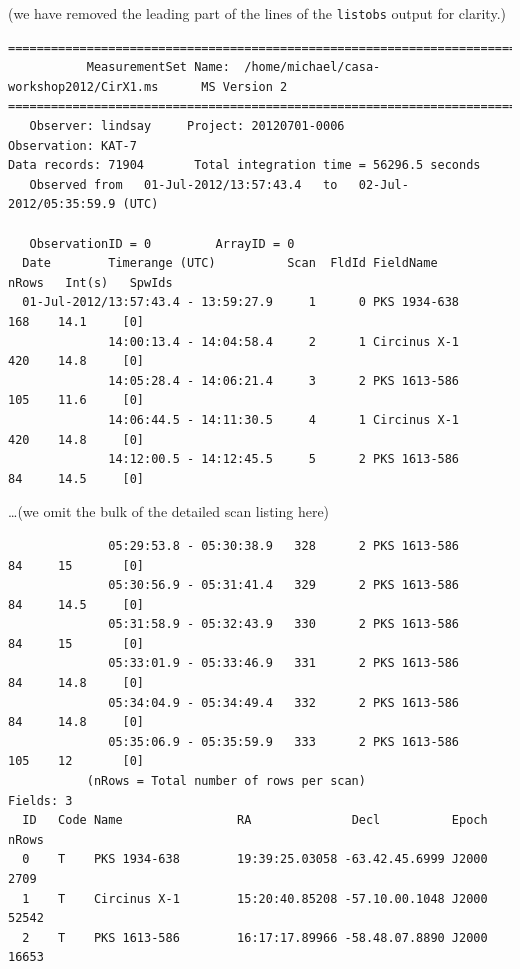\documentclass[force,almostfull,justified]{tufte-book}
\begin{document}
\begin{casaoutput}
(we have removed the leading part of the lines of the {\tt listobs} output
for clarity.)
\begin{verbatim}
================================================================================
           MeasurementSet Name:  /home/michael/casa-workshop2012/CirX1.ms      MS Version 2
================================================================================
   Observer: lindsay     Project: 20120701-0006  
Observation: KAT-7
Data records: 71904       Total integration time = 56296.5 seconds
   Observed from   01-Jul-2012/13:57:43.4   to   02-Jul-2012/05:35:59.9 (UTC)

   ObservationID = 0         ArrayID = 0
  Date        Timerange (UTC)          Scan  FldId FieldName           nRows   Int(s)   SpwIds 
  01-Jul-2012/13:57:43.4 - 13:59:27.9     1      0 PKS 1934-638        168    14.1     [0]                         
              14:00:13.4 - 14:04:58.4     2      1 Circinus X-1        420    14.8     [0]                         
              14:05:28.4 - 14:06:21.4     3      2 PKS 1613-586        105    11.6     [0]                         
              14:06:44.5 - 14:11:30.5     4      1 Circinus X-1        420    14.8     [0]                         
              14:12:00.5 - 14:12:45.5     5      2 PKS 1613-586        84     14.5     [0]                         
\end{verbatim}
\dots (we omit the bulk of the detailed scan listing here)
\begin{verbatim}
              05:29:53.8 - 05:30:38.9   328      2 PKS 1613-586        84     15       [0]                         
              05:30:56.9 - 05:31:41.4   329      2 PKS 1613-586        84     14.5     [0]                         
              05:31:58.9 - 05:32:43.9   330      2 PKS 1613-586        84     15       [0]                         
              05:33:01.9 - 05:33:46.9   331      2 PKS 1613-586        84     14.8     [0]                         
              05:34:04.9 - 05:34:49.4   332      2 PKS 1613-586        84     14.8     [0]                         
              05:35:06.9 - 05:35:59.9   333      2 PKS 1613-586        105    12       [0]                         
           (nRows = Total number of rows per scan) 
Fields: 3
  ID   Code Name                RA              Decl          Epoch   nRows  
  0    T    PKS 1934-638        19:39:25.03058 -63.42.45.6999 J2000   2709   
  1    T    Circinus X-1        15:20:40.85208 -57.10.00.1048 J2000   52542  
  2    T    PKS 1613-586        16:17:17.89966 -58.48.07.8890 J2000   16653  

\end{verbatim}
\end{casaoutput}
\end{document}
